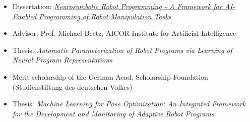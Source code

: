 
\begin{itemize}
  \item Dissertation: \href{https://doi.org/10.26092/elib/3727}{\textit{Neurosymbolic Robot Programming - A Framework for AI-Enabled Programming of Robot Manipulation Tasks}}
  \item Advisor: Prof. Michael Beetz, AICOR Institute for Artificial Intelligence
\end{itemize}

\medskip

\begin{itemize}
  \item Thesis: \textit{Automatic Parameterization of Robot Programs via Learning of Neural Program Representations}
  \item Merit scholarship of the German Acad. Scholarship Foundation (Studienstiftung des deutschen Volkes)
\end{itemize}

\medskip

\begin{itemize}
  \item Thesis: \textit{Machine Learning for Pose Optimization: An Integrated Framework for the Development and Monitoring of Adaptive Robot Programs}
\end{itemize}

\medskip

